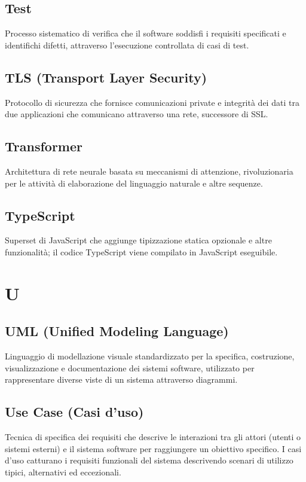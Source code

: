\documentclass[a4paper,11pt]{article}
\begin{document}
\subsection{Test}
Processo sistematico di verifica che il software soddisfi i requisiti specificati e identifichi difetti, attraverso l'esecuzione controllata di casi di test.

\subsection{TLS (Transport Layer Security)}
Protocollo di sicurezza che fornisce comunicazioni private e integrità dei dati tra due applicazioni che comunicano attraverso una rete, successore di SSL.

\subsection{Transformer}
Architettura di rete neurale basata su meccanismi di attenzione, rivoluzionaria per le attività di elaborazione del linguaggio naturale e altre sequenze.

\subsection{TypeScript}
Superset di JavaScript che aggiunge tipizzazione statica opzionale e altre funzionalità; il codice TypeScript viene compilato in JavaScript eseguibile.

\newpage
\section{U}

\subsection{UML (Unified Modeling Language)}
Linguaggio di modellazione visuale standardizzato per la specifica, costruzione, visualizzazione e documentazione dei sistemi software, utilizzato per rappresentare diverse viste di un sistema attraverso diagrammi.

\subsection{Use Case (Casi d'uso)}
Tecnica di specifica dei requisiti che descrive le interazioni tra gli attori (utenti o sistemi esterni) e il sistema software per raggiungere un obiettivo specifico. I casi d'uso catturano i requisiti funzionali del sistema descrivendo scenari di utilizzo tipici, alternativi ed eccezionali.
\end{document}
